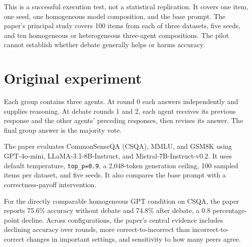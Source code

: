 \documentclass[10pt]{article}
\newcommand{\code}[1]{\texttt{#1}}
\begin{document}
This is a successful execution test, not a statistical replication. It covers one item, one seed,
one homogeneous model composition, and the base prompt. The paper's principal study covers 100
items from each of three datasets, five seeds, and ten homogeneous or heterogeneous three-agent
compositions. The pilot cannot establish whether debate generally helps or harms accuracy.

\section{Original experiment}

Each group contains three agents. At round 0 each answers independently and supplies reasoning.
At debate rounds 1 and 2, each agent receives its previous response and the other agents' preceding
responses, then revises its answer. The final group answer is the majority vote.

\begin{center}
\end{center}

The paper evaluates CommonSenseQA (CSQA), MMLU, and GSM8K using GPT-4o-mini,
LLaMA-3.1-8B-Instruct, and Mistral-7B-Instruct-v0.2. It uses default temperature,
\code{top\_p=0.9}, a 2,048-token generation ceiling, 100 sampled items per dataset, and five seeds.
It also compares the base prompt with a correctness-payoff intervention.

For the directly comparable homogeneous GPT condition on CSQA, the paper reports 75.6\% accuracy
without debate and 74.8\% after debate, a 0.8 percentage-point decline. Across configurations,
the paper's central evidence includes declining accuracy over rounds, more correct-to-incorrect than
incorrect-to-correct changes in important settings, and sensitivity to how many peers agree.
\end{document}
